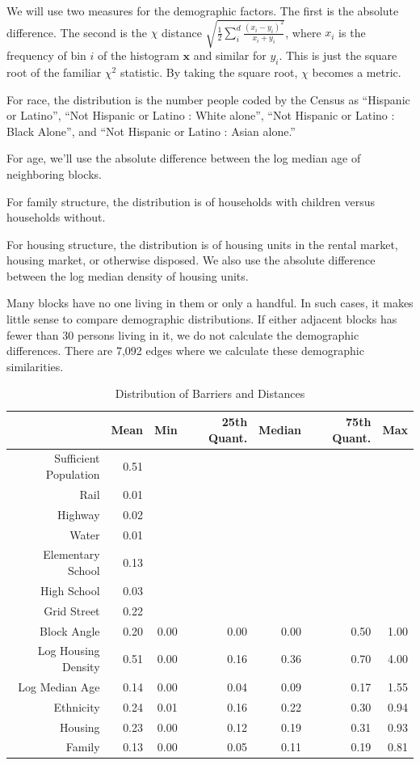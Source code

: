 \documentclass[12pt,letter]{article}\usepackage[]{graphicx}\usepackage[]{color}
\begin{document}
We will use two measures for the demographic factors. The first is the
absolute difference. The second is the $\chi$ distance $\sqrt{
\frac{1}{2} \sum_i^d \frac{(x_i - y_i)^2}{x_i + y_i}}$, where $x_i$ is
the frequency of bin $i$ of the histogram $\mathbf{x}$ and similar for
$y_i$. This is just the square root of the familiar $\chi^2$ statistic. By
taking the square root, $\chi$ becomes a metric.\cite{pele_distance_2011}

For race, the distribution is the number people coded by the Census as
``Hispanic or Latino'', ``Not Hispanic or Latino : White alone'', ``Not Hispanic
or Latino : Black Alone'', and ``Not Hispanic or Latino : Asian alone.''

For age, we'll use the absolute difference between the log median age of
neighboring blocks.

For family structure, the distribution is of households with children
versus households without. 

For housing structure, the distribution is of housing units in the
rental market, housing market, or otherwise disposed. We also use the
absolute difference between the log median density of housing units.

Many blocks have no one living in them or only a handful. In such
cases, it makes little sense to compare demographic distributions. If
either adjacent blocks has fewer than 30 persons living in it, we do
not calculate the demographic differences. There are
7,092 edges where we calculate these
demographic similarities.

\begin{table}[ht]
\centering
\begin{tabular}{rrrrrrr}
  \hline
 & Mean & Min & 25th Quant. & Median & 75th Quant. & Max \\ 
  \hline
Sufficient Population & 0.51 &  &  &  &  &  \\ 
  Rail & 0.01 &  &  &  &  &  \\ 
  Highway & 0.02 &  &  &  &  &  \\ 
  Water & 0.01 &  &  &  &  &  \\ 
  Elementary School & 0.13 &  &  &  &  &  \\ 
  High School & 0.03 &  &  &  &  &  \\ 
  Grid Street & 0.22 &  &  &  &  &  \\ 
  Block Angle & 0.20 & 0.00 & 0.00 & 0.00 & 0.50 & 1.00 \\ 
  Log Housing Density & 0.51 & 0.00 & 0.16 & 0.36 & 0.70 & 4.00 \\ 
  Log Median Age & 0.14 & 0.00 & 0.04 & 0.09 & 0.17 & 1.55 \\ 
  Ethnicity & 0.24 & 0.01 & 0.16 & 0.22 & 0.30 & 0.94 \\ 
  Housing & 0.23 & 0.00 & 0.12 & 0.19 & 0.31 & 0.93 \\ 
  Family & 0.13 & 0.00 & 0.05 & 0.11 & 0.19 & 0.81 \\ 
   \hline
\end{tabular}
\caption{Distribution of Barriers and Distances} 
\label{tab:Distribution}
\end{table}
\end{document}
